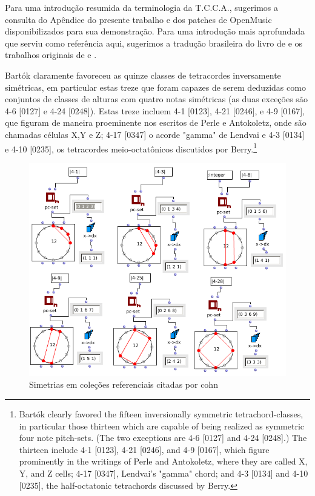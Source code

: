 \documentclass[
	12pt,				%
	openright,			%
	twoside,			%
	a4paper,			%
	english,			%
	french,				%
	spanish,			%
	brazil				%
	]{abntex2}
\begin{document}
Para uma introdução resumida da terminologia da T.C.C.A., sugerimos a consulta do Apêndice do presente trabalho e dos patches de OpenMusic disponibilizados para sua demonstração. Para uma introdução mais aprofundada que serviu como referência aqui, sugerimos a tradução brasileira do livro de  e os trabalhos originais de  e .

\begin{citacao}

Bartók claramente favoreceu as quinze classes de tetracordes inversamente simétricas, em particular estas treze que foram capazes de serem deduzidas como conjuntos de classes de alturas com quatro notas simétricas (as duas exceções são 4-6 [0127] e 4-24 [0248]). Estas treze incluem  4-1 [0123], 4-21 [0246], e 4-9 [0167], que figuram de maneira proeminente nos escritos de Perle e Antokoletz, onde são chamadas células X,Y e Z; 4-17 [0347] o acorde "gamma" de Lendvai e 4-3 [0134] e 4-10 [0235], os tetracordes meio-octatônicos discutidos por Berry.\cite[p. 22]{cohn1988inversional}\footnote{
Bartók clearly favored the fifteen inversionally symmetric tetrachord-classes, in particular those thirteen which are capable of being realized as symmetric four note pitch-sets.
(The two exceptions are 4-6 [0127] and 4-24 [0248].) The thirteen include 4-1 [0123], 4-21 [0246], and 4-9 [0167], which figure prominently in the writings of Perle and Antokoletz, where they are called X, Y, and Z cells; 4-17 [0347], Lendvai's "gamma" chord; and 4-3 [0134] and 4-10 [0235], the half-octatonic tetrachords discussed by Berry.\cite[p. 22]{cohn1988inversional}}
\end{citacao}


\begin{figure}[!h]
	\caption{\label{fig_grafico} Simetrias em coleções referenciais citadas por cohn}
	\begin{center}
	    \includegraphics[scale=0.5]{axis/colecoes_simetricas.png}
	\end{center}
\end{figure}
\end{document}

